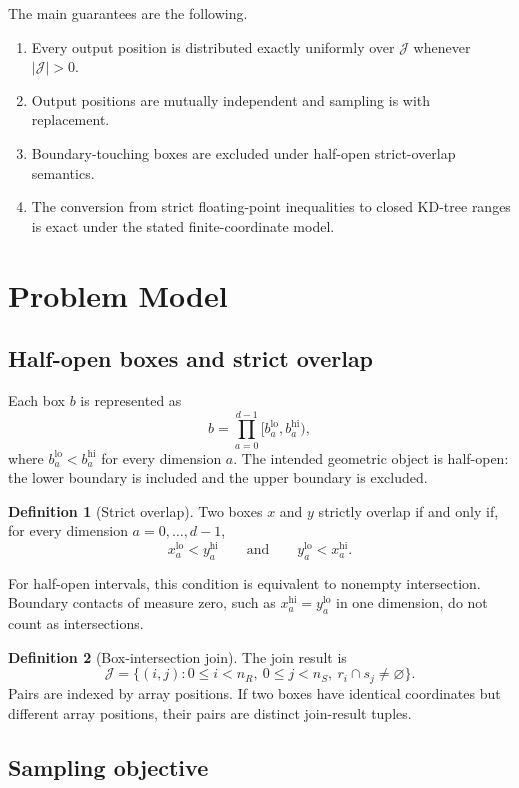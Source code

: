 \documentclass[11pt]{article}
\theoremstyle{definition}
\newtheorem{definition}{Definition}[section]
\theoremstyle{plain}
\theoremstyle{remark}
\newcommand{\Jset}{\mathcal J}
\newcommand{\lo}{\mathrm{lo}}
\newcommand{\hi}{\mathrm{hi}}
\begin{document}
The main guarantees are the following.
\begin{enumerate}[leftmargin=2em]
  \item Every output position is distributed exactly uniformly over $\Jset$ whenever
        $|\Jset|>0$.
  \item Output positions are mutually independent and sampling is with replacement.
  \item Boundary-touching boxes are excluded under half-open strict-overlap semantics.
  \item The conversion from strict floating-point inequalities to closed KD-tree ranges is
        exact under the stated finite-coordinate model.
\end{enumerate}

\section{Problem Model}

\subsection{Half-open boxes and strict overlap}

Each box $b$ is represented as
\[
  b = \prod_{a=0}^{d-1} [b^{\lo}_a,b^{\hi}_a),
\]
where $b^{\lo}_a < b^{\hi}_a$ for every dimension $a$.  The intended geometric object is
half-open: the lower boundary is included and the upper boundary is excluded.

\begin{definition}[Strict overlap]
Two boxes $x$ and $y$ strictly overlap if and only if, for every dimension
$a=0,\ldots,d-1$,
\[
  x^{\lo}_a < y^{\hi}_a
  \qquad\text{and}\qquad
  y^{\lo}_a < x^{\hi}_a.
\]
\end{definition}

For half-open intervals, this condition is equivalent to nonempty intersection.  Boundary
contacts of measure zero, such as $x^{\hi}_a=y^{\lo}_a$ in one dimension, do not count as
intersections.

\begin{definition}[Box-intersection join]
The join result is
\[
  \Jset = \{(i,j): 0\le i<n_R,\ 0\le j<n_S,\ r_i\cap s_j\neq\varnothing\}.
\]
Pairs are indexed by array positions.  If two boxes have identical coordinates but different
array positions, their pairs are distinct join-result tuples.
\end{definition}

\subsection{Sampling objective}
\end{document}
